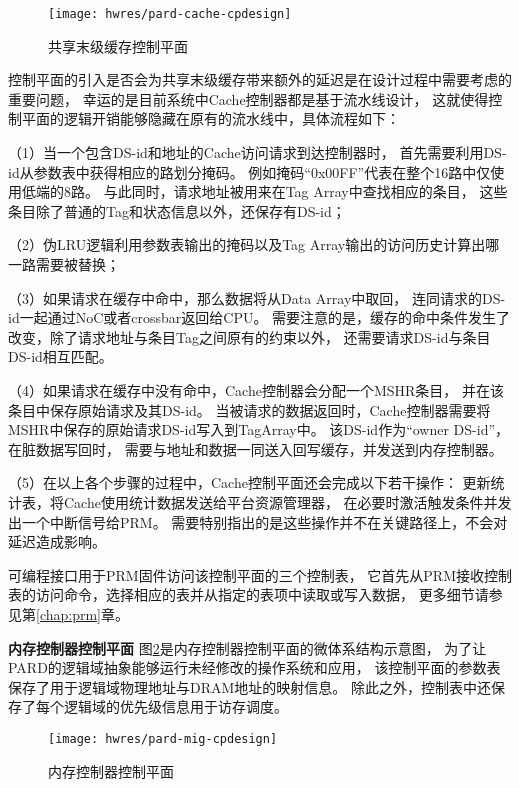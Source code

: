 \begin{figure}[tb]
  \centering
  \texttt{[image: hwres/pard-cache-cpdesign]}
  \caption{共享末级缓存控制平面}
  \label{fig:pard-cache-cpdesign}
\end{figure}

控制平面的引入是否会为共享末级缓存带来额外的延迟是在设计过程中需要考虑的重要问题，
幸运的是目前系统中Cache控制器都是基于流水线设计，
这就使得控制平面的逻辑开销能够隐藏在原有的流水线中，具体流程如下：

（1）当一个包含DS-id和地址的Cache访问请求到达控制器时，
首先需要利用DS-id从参数表中获得相应的路划分掩码。
例如掩码``0x00FF''代表在整个16路中仅使用低端的8路。
与此同时，请求地址被用来在Tag Array中查找相应的条目，
这些条目除了普通的Tag和状态信息以外，还保存有DS-id；

（2）伪LRU逻辑利用参数表输出的掩码以及Tag Array输出的访问历史计算出哪一路需要被替换；

（3）如果请求在缓存中命中，那么数据将从Data Array中取回，
连同请求的DS-id一起通过NoC或者crossbar返回给CPU。
需要注意的是，缓存的命中条件发生了改变，除了请求地址与条目Tag之间原有的约束以外，
还需要请求DS-id与条目DS-id相互匹配。

（4）如果请求在缓存中没有命中，Cache控制器会分配一个MSHR条目，
并在该条目中保存原始请求及其DS-id。
当被请求的数据返回时，Cache控制器需要将MSHR中保存的原始请求DS-id写入到TagArray中。
该DS-id作为``owner DS-id''，在脏数据写回时，
需要与地址和数据一同送入回写缓存，并发送到内存控制器。

（5）在以上各个步骤的过程中，Cache控制平面还会完成以下若干操作：
更新统计表，将Cache使用统计数据发送给平台资源管理器，
在必要时激活触发条件并发出一个中断信号给PRM。
需要特别指出的是这些操作并不在关键路径上，不会对延迟造成影响。

可编程接口用于PRM固件访问该控制平面的三个控制表，
它首先从PRM接收控制表的访问命令，选择相应的表并从指定的表项中读取或写入数据，
更多细节请参见第\ref{chap:prm}章。


\textbf{内存控制器控制平面}\quad
图\ref{fig:pard-mig-cpdesign}是内存控制器控制平面的微体系结构示意图，
为了让PARD的逻辑域抽象能够运行未经修改的操作系统和应用，
该控制平面的参数表保存了用于逻辑域物理地址与DRAM地址的映射信息。
除此之外，控制表中还保存了每个逻辑域的优先级信息用于访存调度。

\begin{figure}[tb]
  \centering
  \texttt{[image: hwres/pard-mig-cpdesign]}
  \caption{内存控制器控制平面}
  \label{fig:pard-mig-cpdesign}
\end{figure}

